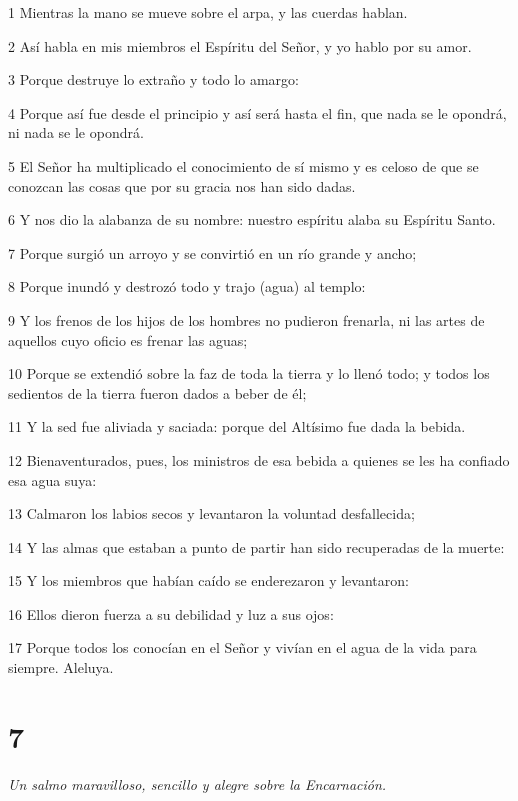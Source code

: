\par 1 Mientras la mano se mueve sobre el arpa, y las cuerdas hablan.
\par 2 Así habla en mis miembros el Espíritu del Señor, y yo hablo por su amor.
\par 3 Porque destruye lo extraño y todo lo amargo:
\par 4 Porque así fue desde el principio y así será hasta el fin, que nada se le opondrá, ni nada se le opondrá.
\par 5 El Señor ha multiplicado el conocimiento de sí mismo y es celoso de que se conozcan las cosas que por su gracia nos han sido dadas.
\par 6 Y nos dio la alabanza de su nombre: nuestro espíritu alaba su Espíritu Santo.
\par 7 Porque surgió un arroyo y se convirtió en un río grande y ancho;
\par 8 Porque inundó y destrozó todo y trajo (agua) al templo:
\par 9 Y los frenos de los hijos de los hombres no pudieron frenarla, ni las artes de aquellos cuyo oficio es frenar las aguas;
\par 10 Porque se extendió sobre la faz de toda la tierra y lo llenó todo; y todos los sedientos de la tierra fueron dados a beber de él;
\par 11 Y la sed fue aliviada y saciada: porque del Altísimo fue dada la bebida.
\par 12 Bienaventurados, pues, los ministros de esa bebida a quienes se les ha confiado esa agua suya:
\par 13 Calmaron los labios secos y levantaron la voluntad desfallecida;
\par 14 Y las almas que estaban a punto de partir han sido recuperadas de la muerte:
\par 15 Y los miembros que habían caído se enderezaron y levantaron:
\par 16 Ellos dieron fuerza a su debilidad y luz a sus ojos:
\par 17 Porque todos los conocían en el Señor y vivían en el agua de la vida para siempre. Aleluya.



\chapter{7}

\par \textit{Un salmo maravilloso, sencillo y alegre sobre la Encarnación.}


